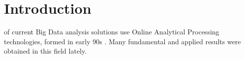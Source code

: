\documentclass[10pt,journal,cspaper,compsoc]{IEEEtran}
\begin{document}
%
\IEEEpeerreviewmaketitle



\section{Introduction}
%
%



% 
% 
% 
% 
 of current Big Data analysis solutions use Online
Analytical Processing technologies, formed in early 90s \cite{codd}. Many
fundamental \cite{lecht,lehner,mazon} and applied \cite{vassi, peder,
progressive, giorg} results were obtained in this field lately.
\end{document}

